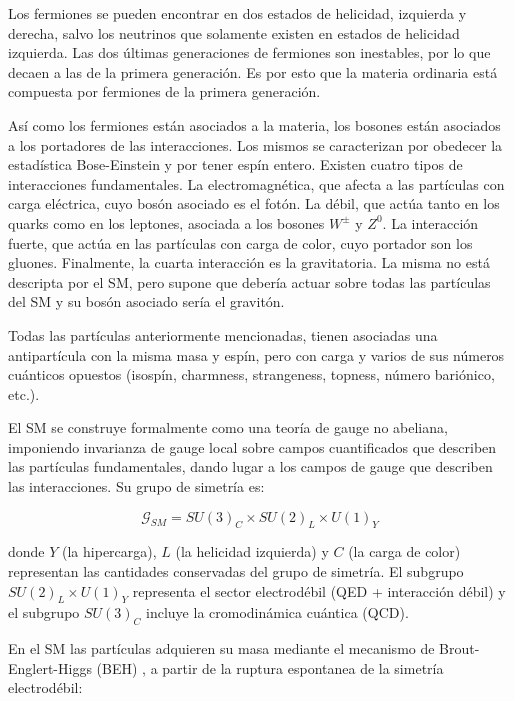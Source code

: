 Los fermiones se pueden encontrar en dos estados de helicidad, izquierda y derecha, salvo los neutrinos que solamente existen en estados de helicidad izquierda. Las dos últimas generaciones de fermiones son inestables, por lo que decaen a las de la primera generación. Es por esto que la materia ordinaria está compuesta por fermiones de la primera generación.

Así como los fermiones están asociados a la materia, los bosones están asociados a los portadores de las interacciones. Los mismos se caracterizan por obedecer la estadística Bose-Einstein y por tener espín entero. Existen cuatro tipos de interacciones fundamentales. La electromagnética, que afecta a las partículas con carga eléctrica, cuyo bosón asociado es el fotón. La débil, que actúa tanto en los quarks como en los leptones, asociada a los bosones $W^{\pm}$ y $Z^{0}$. La interacción fuerte, que actúa en las partículas con carga de color, cuyo portador son los gluones. Finalmente, la cuarta interacción es la gravitatoria. La misma no está descripta por el SM, pero supone que debería actuar sobre todas las partículas del SM y su bosón asociado sería el gravitón.

Todas las partículas anteriormente mencionadas, tienen asociadas una antipartícula con la misma masa y espín, pero con carga y varios de sus números cuánticos opuestos (isospín, charmness, strangeness, topness, número bariónico, etc.). 

El SM se construye formalmente como una teoría de gauge no abeliana, imponiendo invarianza de gauge local sobre campos cuantificados que describen las partículas fundamentales, dando lugar a los campos de gauge que describen las interacciones. Su grupo de simetría es:

\begin{equation}
\mathcal{G}_{SM}=SU(3)_{C}\times SU(2)_{L}\times U(1)_{Y}
\end{equation}

\noindent
donde $Y$ (la hipercarga), $L$ (la helicidad izquierda) y $C$ (la carga de color) representan las cantidades conservadas del grupo de simetría. El subgrupo $SU(2)_{L}\times U(1)_{Y}$ representa el sector electrodébil (QED + interacción débil) y el subgrupo $SU(3)_{C}$ incluye la cromodinámica cuántica (QCD).


En el SM las partículas adquieren su masa mediante el mecanismo de Brout-Englert-Higgs (BEH) \cite{Englert:1964et,Higgs:1964ia,Higgs:1964pj,Guralnik:1964eu,Higgs:1966ev,Kibble:1967sv} , a partir de la ruptura espontanea de la simetría electrodébil:

